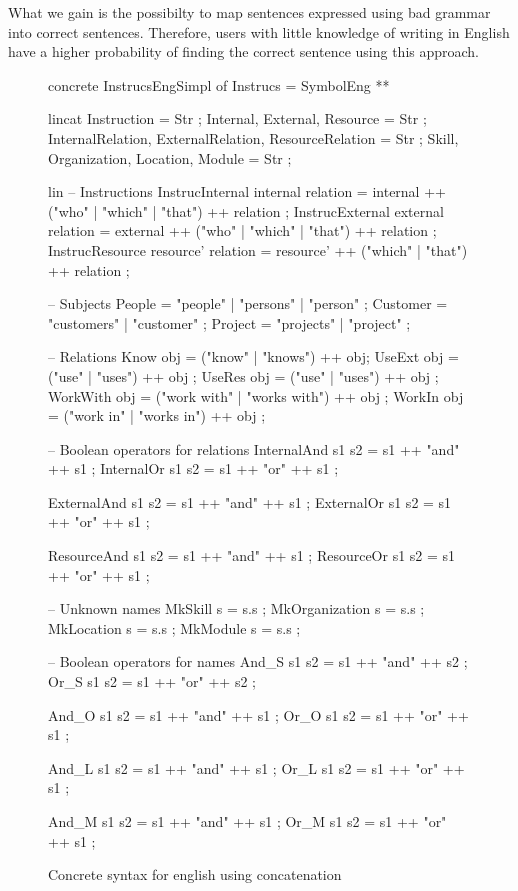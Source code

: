 What we gain is the possibilty to map sentences expressed using bad grammar into correct sentences. Therefore, users with little knowledge of writing in English have a higher probability of finding the correct sentence using this approach.
\begin{figure}[H]
\begin{code}
concrete InstrucsEngSimpl of Instrucs = SymbolEng ** {
 lincat
  Instruction = Str ;
  Internal, External, Resource = Str ;
  InternalRelation, ExternalRelation, ResourceRelation = Str ;
  Skill, Organization, Location, Module = Str ;

 lin
  -- Instructions
  InstrucInternal internal relation = internal ++ 
                                   ("who" | "which" | "that") ++ relation ;
  InstrucExternal external relation = external ++ 
                                   ("who" | "which" | "that") ++ relation ;
  InstrucResource resource' relation = resource' ++ 
                                   ("which" | "that") ++ relation ;

  -- Subjects
  People = "people" | "persons" | "person" ;
  Customer = "customers" | "customer" ;
  Project = "projects" | "project" ;

  -- Relations
  Know obj = ("know" | "knows") ++ obj;
  UseExt obj = ("use" | "uses") ++ obj ;
  UseRes obj = ("use" | "uses") ++ obj ;
  WorkWith obj = ("work with" | "works with") ++ obj ;
  WorkIn obj = ("work in" | "works in") ++ obj ;

  -- Boolean operators for relations
  InternalAnd s1 s2 = s1 ++ "and" ++ s1 ;
  InternalOr s1 s2 = s1 ++ "or" ++ s1 ;

  ExternalAnd s1 s2 = s1 ++ "and" ++ s1 ;
  ExternalOr s1 s2 = s1 ++ "or" ++ s1 ;

  ResourceAnd s1 s2 = s1 ++ "and" ++ s1 ;
  ResourceOr s1 s2 = s1 ++ "or" ++ s1 ; 

  -- Unknown names
  MkSkill s = s.s ;
  MkOrganization s = s.s ;
  MkLocation s = s.s ;
  MkModule s = s.s ;

  -- Boolean operators for names
  And_S s1 s2 = s1 ++ "and" ++ s2 ;
  Or_S s1 s2 = s1 ++ "or" ++ s2 ;
	  
  And_O s1 s2 = s1 ++ "and" ++ s1 ;
  Or_O s1 s2 = s1 ++ "or" ++ s1 ;
	  
  And_L s1 s2 = s1 ++ "and" ++ s1 ;
  Or_L s1 s2 = s1 ++ "or" ++ s1 ;
	  
  And_M s1 s2 = s1 ++ "and" ++ s1 ;
  Or_M s1 s2 = s1 ++ "or" ++ s1 ;
}
\end{code}
\caption{Concrete syntax for english using concatenation\label{fig:concat-english}}
\end{figure}



